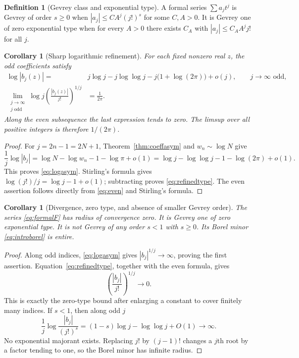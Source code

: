 \documentclass[11pt,a4paper]{article}
\numberwithin{equation}{section}
\newtheorem{corollary}[theorem]{Corollary}
\theoremstyle{definition}
\newtheorem{definition}[theorem]{Definition}
\theoremstyle{remark}
\begin{document}
\begin{definition}[Gevrey class and exponential type]
A formal series $\sum a_jt^j$ is Gevrey of order $s\ge0$ when
$|a_j|\le CA^j(j!)^s$ for some $C,A>0$. It is Gevrey one of zero exponential type when for every $A>0$ there exists $C_A$ with
$|a_j|\le C_AA^jj!$ for all $j$.
\end{definition}

\begin{corollary}[Sharp logarithmic refinement]
\label{cor:type}
For each fixed nonzero real $z$, the odd coefficients satisfy
\begin{align}
 \log|b_j(z)|={}&j\log j-j\log\log j
             -j\bigl(1+\log(2\pi)\bigr)+o(j),
 \qquad j\to\infty\text{ odd},\label{eq:logasym}\\
 \lim_{\substack{j\to\infty\\j\text{ odd}}}
  \log j\left(\frac{|b_j(z)|}{j!}\right)^{1/j}
  & =\frac1{2\pi}.
 \label{eq:refinedtype}
\end{align}
Along the even subsequence the last expression tends to zero. The limsup over all positive integers is therefore $1/(2\pi)$.
\end{corollary}
\begin{proof}
For $j=2n-1=2N+1$, Theorem~\ref{thm:coeffasym} and $w_n\sim\log N$ give
\[
 \frac1j\log|b_j|
 =\log N-\log w_n-1-\log\pi+o(1)
 =\log j-\log\log j-1-\log(2\pi)+o(1).
\]
This proves \eqref{eq:logasym}. Stirling's formula gives
$\log(j!)/j=\log j-1+o(1)$; subtracting proves \eqref{eq:refinedtype}. The even assertion follows directly from \eqref{eq:even} and Stirling's formula.
\end{proof}

\begin{corollary}[Divergence, zero type, and absence of smaller Gevrey order]
\label{cor:gevrey}
The series \eqref{eq:formalF} has radius of convergence zero. It is Gevrey one of zero exponential type. It is not Gevrey of any order $s<1$ with $s\ge0$. Its Borel minor \eqref{eq:introborel} is entire.
\end{corollary}
\begin{proof}
Along odd indices, \eqref{eq:logasym} gives $|b_j|^{1/j}\to\infty$, proving the first assertion. Equation~\eqref{eq:refinedtype}, together with the even formula, gives
\[
 \left(\frac{|b_j|}{j!}\right)^{1/j}\longrightarrow0.
\]
This is exactly the zero-type bound after enlarging a constant to cover finitely many indices. If $s<1$, then along odd $j$
\[
 \frac1j\log\frac{|b_j|}{(j!)^s}
 =(1-s)\log j-\log\log j+O(1)\longrightarrow\infty.
\]
No exponential majorant exists. Replacing $j!$ by $(j-1)!$ changes a $j$th root by a factor tending to one, so the Borel minor has infinite radius.
\end{proof}
\end{document}
